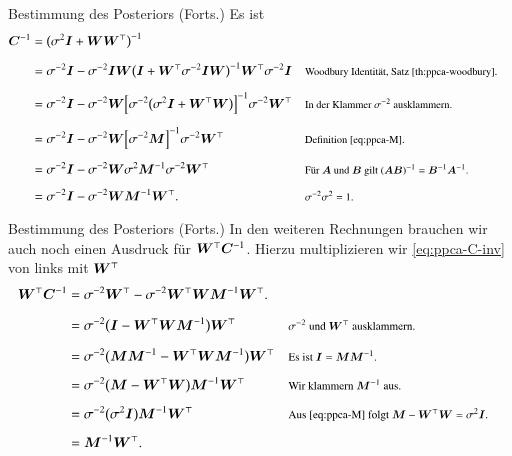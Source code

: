 \begin{frame}{Bestimmung des Posteriors (Forts.)}{}
	Es ist
	\begin{equation} \label{eq:ppca-C-inv}
		\begin{aligned}
			\bC^{-1}
				&= \bigl( \sigma^2 \bI + \bW \bW^\top \bigr)^{-1}
		\\[2mm]
				&= \sigma^{-2} \bI - \sigma^{-2} \bI \bW \bigl( \bI + \bW^\top \sigma^{-2} \bI \bW \bigr)^{-1}
					\bW^\top \sigma^{-2} \bI
				&& \rem{Woodbury Identität, Satz \ref{th:ppca-woodbury}.}
		\\[2mm]
				&= \sigma^{-2} \bI - \sigma^{-2} \bW \Bigl[ \sigma^{-2} \bigl( \sigma^2 \bI + \bW^\top \bW \bigr) \Bigr]^{-1}
					\sigma^{-2} \bW^\top
				&& \rem{In der Klammer $\sigma^{-2}$ ausklammern.}
		\\[2mm]
				&= \sigma^{-2} \bI - \sigma^{-2} \bW \Bigl[ \sigma^{-2} \bM \Bigr]^{-1} \sigma^{-2} \bW^\top
				&& \rem{Definition \eqref{eq:ppca-M}.}
		\\[2mm]
				&= \sigma^{-2} \bI - \sigma^{-2} \bW \sigma^2 \bM^{-1} \sigma^{-2} \bW^\top
				&& \rem{Für $\bA$ und $\bB$ gilt $(\bA \bB)^{-1} = \bB^{-1} \bA^{-1}$.}
		\\[2mm]
				&= \sigma^{-2} \bI - \sigma^{-2} \bW \bM^{-1} \bW^\top.
				&& \rem{$\sigma^{-2} \sigma^2 = 1$.}
		\end{aligned}
	\end{equation}
\end{frame}


\begin{frame}{Bestimmung des Posteriors (Forts.)}{}
	In den weiteren Rechnungen brauchen wir auch noch einen Ausdruck für $\bm{W}^\top \bm{C}^{-1}$.
	Hierzu multiplizieren wir \eqref{eq:ppca-C-inv} von links mit $\bm{W}^\top$
	\begin{equation} \label{eq:ppca-W-top-C-inv}
		\begin{aligned}
			\bW^\top \bC^{-1}
				&= \sigma^{-2} \bW^\top - \sigma^{-2} \bW^\top \bW \bM^{-1} \bW^\top.
		\\[2mm]
				&= \sigma^{-2} \bigl( \bI - \bW^\top \bW \bM^{-1} \bigr) \bW^\top
				&& \rem{$\sigma^{-2}$ und $\bW^\top$ ausklammern.}
		\\[2mm]
				&= \sigma^{-2} \bigl( \bM \bM^{-1} - \bW^\top \bW \bM^{-1} \bigr) \bW^\top
				&& \rem{Es ist $\bI = \bM \bM^{-1}$.}
		\\[2mm]
				&= \sigma^{-2} \bigl( \bM - \bW^\top \bW \bigr) \bM^{-1} \bW^\top
				&& \rem{Wir klammern $\bM^{-1}$ aus.}
		\\[2mm]
				&= \sigma^{-2} \bigl( \sigma^2 \bI \bigr) \bM^{-1} \bW^\top
				&& \rem{Aus \eqref{eq:ppca-M} folgt $\bM - \bW^\top \bW = \sigma^2 \bI$.}
		\\[2mm]
				&= \bM^{-1} \bW^\top.
		\end{aligned}
	\end{equation}
\end{frame}


